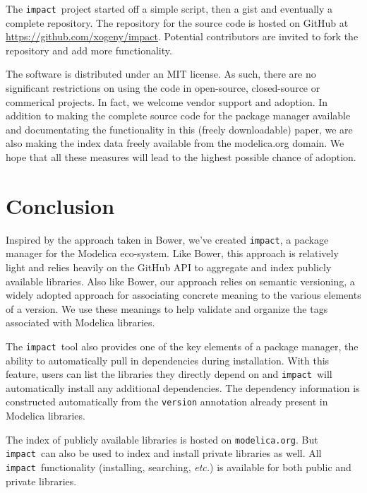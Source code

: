 \documentclass[11pt,a4paper,twocolumn]{article}
\newcommand{\impact}{\texttt{impact}} %
\newcommand{\code}[1]{\texttt{#1}} %
\begin{document}
The \impact\ project started off a simple script, then a gist and
eventually a complete repository.  The repository for the source code
is hosted on GitHub at \url{https://github.com/xogeny/impact}.
Potential contributors are invited to fork the repository and add more
functionality.

The software is distributed under an MIT license.  As such, there are
no significant restrictions on using the code in open-source,
closed-source or commerical projects.  In fact, we welcome vendor
support and adoption.  In addition to making the complete source code
for the package manager available and documentating the functionality
in this (freely downloadable) paper, we are also making the index data
freely available from the modelica.org domain.  We hope that all these
measures will lead to the highest possible chance of adoption.

\section{Conclusion}
\label{sec:conclusion}


Inspired by the approach taken in Bower, we've created \impact, a
package manager for the Modelica eco-system.  Like Bower, this
approach is relatively light and relies heavily on the GitHub API to
aggregate and index publicly available libraries.  Also like Bower,
our approach relies on semantic versioning, a widely adopted approach
for associating concrete meaning to the various elements of a version.
We use these meanings to help validate and organize the tags
associated with Modelica libraries.

The \impact\ tool also provides one of the key elements of a package
manager, the ability to automatically pull in dependencies during
installation.  With this feature, users can list the libraries they
directly depend on and \impact\ will automatically install any
additional dependencies.  The dependency information is constructed
automatically from the \code{version} annotation already present in
Modelica libraries.

The index of publicly available libraries is hosted on
\code{modelica.org}.  But \impact\ can also be used to index and
install private libraries as well.  All \impact\ functionality
(installing, searching, \textit{etc.}) is available for both public
and private libraries.

\printbibliography
\end{document}
